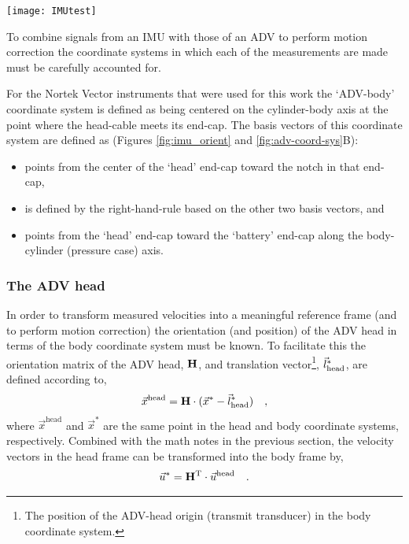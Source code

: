 \begin{figure*}
  \centering
  \texttt{[image: IMUtest]}
  \caption{The circuit-board and pressure-case end-cap of a Nortek Vector equipped with a Microstrain IMU.  The ADV-body coordinate system (yellow) is depicted on the right. The notch in the end-cap defines the $\hat{x}^*$ direction (out of the page), and the $\hat{z}^*$ direction points back along the pressure case axis. A zoom-in on the Microstrain chip highlights its coordinate system (magenta) relative to the body. }
  \label{fig:imu_orient}
\end{figure*}

To combine signals from an IMU with those of an ADV to perform motion correction the coordinate systems in which each of the measurements are made must be carefully accounted for. 

For the Nortek Vector instruments that were used for this work the `ADV-body' coordinate system is defined as being centered on the cylinder-body axis at the point where the head-cable meets its end-cap.  The basis vectors of this coordinate system are defined as (Figures \ref{fig:imu_orient} and \ref{fig:adv-coord-sys}B):
\begin{itemize}
\item[$\hat{x}^*$:] points from the center of the `head' end-cap toward the notch in that end-cap,
\item[$\hat{y}^*$:] is defined by the right-hand-rule based on the other two basis vectors, and
\item[$\hat{z}^*$:] points from the `head' end-cap toward the `battery' end-cap along the body-cylinder (pressure case) axis.
\end{itemize}

\subsubsection{The ADV head}

In order to transform measured velocities into a meaningful reference frame (and to perform motion correction) the orientation (and position) of the ADV head in terms of the body coordinate system must be known. To facilitate this the orientation matrix of the ADV head, $\mathbf{H}$, and translation vector\footnote{The position of the ADV-head origin (transmit transducer) in the body coordinate system.}, $\vec{l}_\mathrm{head}^*$, are defined according to,
\begin{align}
  \label{eqn:coord_sys}
  \vec{x}^\mathrm{head} &= \mathbf{H} \cdot (\vec{x}^* - \vec{l}_\mathrm{head}^*) & ,
\end{align}
where $\vec{x}^\mathrm{head}$ and $\vec{x}^*$ are the same point in the head and body coordinate systems, respectively. Combined with the math notes in the previous section, the velocity vectors in the head frame can be transformed into the body frame by,
\begin{align}
  \label{eqn:coord_sys2}
  \vec{u}^* &=  \mathbf{H}^\mathrm{T} \cdot \vec{u}^\mathrm{head} & .
\end{align}

